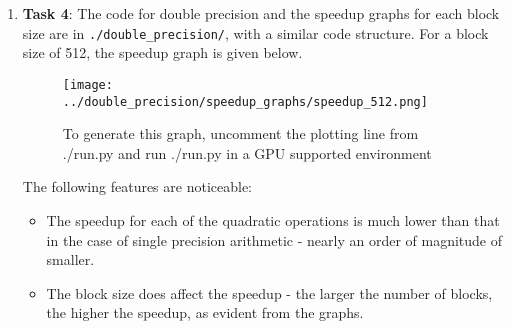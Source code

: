 \documentclass[fleqn, 11pt]{article}
\begin{document}
\begin{enumerate}
 \item \textbf{Task 4}:  The code for double precision and the speedup graphs for each block size are in \texttt{./double\_precision/}, with a similar code structure.  For a block size of 512, the speedup graph is given below.
       
\begin{figure}[h]
\texttt{[image: ../double\_precision/speedup\_graphs/speedup\_512.png]}
\centering 
\caption*{{\tiny To generate this graph, uncomment the plotting line from ./run.py and run ./run.py in a GPU supported environment}}
\end{figure} 
\par

The following features are noticeable:
\begin{itemize}
 \item The speedup for each of the quadratic operations is much lower than that in the case of single precision arithmetic - nearly an order of magnitude of smaller.
 \item The block size does affect the speedup - the larger the number of blocks, the higher the speedup, as evident from the graphs.
\end{itemize}


\end{enumerate}
\end{document}
